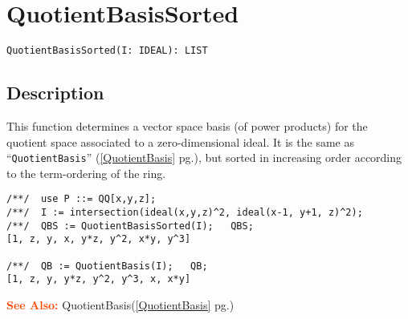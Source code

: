\documentclass[a4paper]{mybook}
\newenvironment{command}{}{} %
\newcommand\SeeAlso{\par\textcolor{OrangeRed}{\textbf{\large See Also: }}}
\begin{document}
\section{QuotientBasisSorted}
\label{QuotientBasisSorted}
\begin{command} %


\begin{Verbatim}[label=syntax, rulecolor=\color{MidnightBlue},
frame=single]
QuotientBasisSorted(I: IDEAL): LIST
\end{Verbatim}


\subsection*{Description}

This function determines a vector space basis (of power products)
for the quotient space associated to a zero-dimensional ideal.
It is the same as ``\verb&QuotientBasis&'' (\ref{QuotientBasis} pg.\pageref{QuotientBasis}), but sorted
in increasing order according to the  term-ordering of the ring.
\begin{Verbatim}[label=example, rulecolor=\color{PineGreen}, frame=single]
/**/  use P ::= QQ[x,y,z];
/**/  I := intersection(ideal(x,y,z)^2, ideal(x-1, y+1, z)^2);
/**/  QBS := QuotientBasisSorted(I);   QBS;
[1, z, y, x, y*z, y^2, x*y, y^3]

/**/  QB := QuotientBasis(I);   QB;
[1, z, y, y*z, y^2, y^3, x, x*y]
\end{Verbatim}


\SeeAlso %
  QuotientBasis(\ref{QuotientBasis} pg.\pageref{QuotientBasis})
\end{command} %
\end{document}
